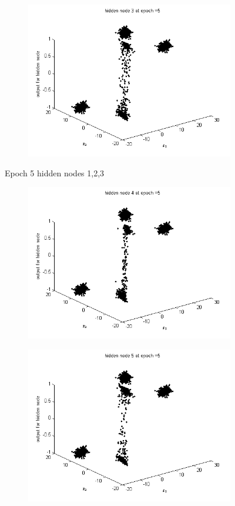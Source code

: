 \documentclass{article}
\begin{document}
\begin{flushleft}
\begin{figure}
\begin{subfigure}{.3\textwidth}
\end{subfigure}
\begin{subfigure}{.3\textwidth}
  \centering
  \includegraphics[width=.8\linewidth]{Classification/linearlySeparable/h5_3}
  
\end{subfigure}
\caption{Epoch 5 hidden nodes 1,2,3}
\end{figure}

\begin{figure}
\begin{subfigure}{.3\textwidth}
  \centering
  \includegraphics[width=.8\linewidth]{Classification/linearlySeparable/h5_4}
 
\end{subfigure}%
\begin{subfigure}{.3\textwidth}
  \centering
  \includegraphics[width=.8\linewidth]{Classification/linearlySeparable/h5_5}
  

\end{subfigure}
\end{figure}
\end{flushleft}
\end{document}
